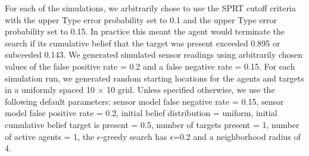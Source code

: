 \par For each of the simulations, we arbitrarily chose to use the SPRT cutoff criteria with the upper Type  error probability set to 0.1 and the upper Type  error probability set to 0.15. In practice this meant the agent would terminate the search if its cumulative belief that the target was present exceeded 0.895 or subceeded 0.143. We generated simulated sensor readings using arbitrarily chosen values of the false positive rate = 0.2 and a false negative rate = 0.15. For each simulation run, we generated random starting locations for the agents and targets in a uniformly spaced 10 $\times$ 10 grid. Unless specified otherwise, we use the following default parameters: sensor model false negative rate = 0.15, sensor model false positive rate = 0.2, initial belief distribution = uniform, initial cumulative belief target is present = 0.5, number of targets present = 1, number of active agents = 1, the $\epsilon$-greedy search has $\epsilon$=0.2 and a neighborhood radius of 4. 





